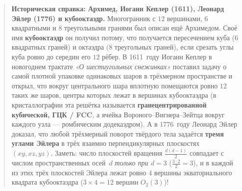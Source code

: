 \begin{quote}
\small\textbf{Историческая справка: Архимед, Иоганн Кеплер (1611), Леонард Эйлер (1776) и кубооктаэдр.}
Многогранник с $12$ вершинами, $6$ квадратными и $8$ треугольными гранями был описан ещё Архимедом. Своё имя \textbf{кубооктаэдр} он получил потому, что получается пересечением куба ($6$ квадратных граней) и октаэдра ($8$ треугольных граней), если срезать углы куба ровно до середин его $12$ рёбер. В 1611~году Иоганн Кеплер в новогоднем трактате \emph{«О шестиугольных снежинках»} поставил задачу о самой плотной упаковке одинаковых шаров в трёхмерном пространстве и открыл, что вокруг центрального шара вплотную помещаются ровно $12$ таких же шаров, центры которых лежат в вершинах кубооктаэдра (в кристаллографии эта решётка называется \textbf{гранецентрированной кубической, ГЦК / FCC}, а ячейка Вороного--Вигнера--Зейтца вокруг каждого узла --- ромбическим додекаэдром). А в 1776~году Леонард Эйлер доказал, что любой трёхмерный поворот твёрдого тела задаётся \textbf{тремя углами Эйлера} в трёх взаимно перпендикулярных плоскостях $(xy, xz, yz)$. Заметь: число плоскостей вращения $\frac{d(d-1)}{2}$ совпадает с числом пространственных осей~$d$ \emph{только при $d = 3$} ($\frac{3\cdot 2}{2} = 3$), и в каждой из этих трёх плоскостей Эйлера лежат ровно $4$ вершины экваториального квадрата кубооктаэдра ($3 \times 4 = 12$ вершин $O_2(3)$)!
\end{quote}

